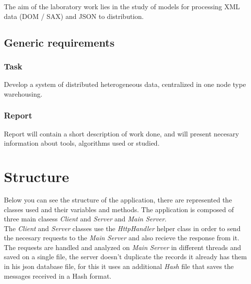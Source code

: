 \documentclass[12pt]{article}
\begin{document}
  The aim of the laboratory work lies in the study of models for processing XML data (DOM / SAX) and JSON to distribution.

  \subsection{Generic requirements}

  \subsubsection{Task}

  Develop a system of distributed heterogeneous data, centralized in one node type warehousing.

  \subsubsection{Report}

  Report will contain a short description of work done, and will present necesary information
  about tools, algorithms used or studied.

  
  \section{Structure}

    Below you can see the structure of the application, there are represented the classes used 
    and their variables and methods. The application is composed of three main clasess \textit{Client}
    and \textit{Server} and \textit{Main Server}. \\

    The \textit{Client} and \textit{Server} classes use the \textit{HttpHandler} helper class in order to
    send the necesary requests to the \textit{Main Server} and also recieve the response from it. \\ 

    The requests are handled and analyzed on \textit{Main Server} in different threads and saved on 
    a single file, the server doesn't duplicate the records it already has them in his json database file, 
    for this it uses an additional \textit{Hash} file that saves the messages received in a Hash format. 
\end{document}
